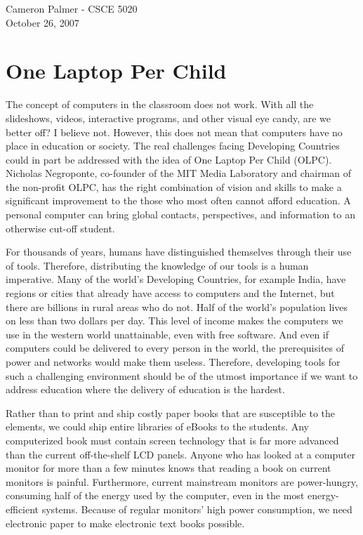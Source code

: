\documentclass[12pt,twoside,letterpaper]{article}
\begin{document}
Cameron Palmer - CSCE 5020\\
October 26, 2007
\section*{One Laptop Per Child}
The concept of computers in the classroom does not work. With all the slideshows, videos, interactive programs, and other visual eye candy, are we better off? I believe not. However, this does not mean that computers have no place in education or society. The real challenges facing Developing Countries could in part be addressed with the idea of One Laptop Per Child (OLPC). Nicholas Negroponte, co-founder of the MIT Media Laboratory and chairman of the non-profit OLPC, has the right combination of vision and skills to make a significant improvement to the those who most often cannot afford education. A personal computer can bring global contacts, perspectives, and information to an otherwise cut-off student.

For thousands of years, humans have distinguished themselves through their use of tools. Therefore, distributing the knowledge of our tools is a human imperative. Many of the world's Developing Countries, for example India, have regions or cities that already have access to computers and the Internet, but there are billions in rural areas who do not. Half of the world’s population lives on less than two dollars per day. This level of income makes the computers we use in the western world unattainable, even with free software. And even if computers could be delivered to every person in the world, the prerequisites of power and networks would make them useless. Therefore, developing tools for such a challenging environment should be of the utmost importance if we want to address education where the delivery of education is the hardest. 

Rather than to print and ship costly paper books that are susceptible to the elements, we could ship entire libraries of eBooks to the students. Any computerized book must contain screen technology that is far more advanced than the current off-the-shelf LCD panels. Anyone who has looked at a computer monitor for more than a few minutes knows that reading a book on current monitors is painful. Furthermore, current mainstream monitors are power-hungry, consuming half of the energy used by the computer, even in the most energy-efficient systems. Because of regular monitors’ high power consumption, we need electronic paper to make electronic text books possible. 
\end{document}
